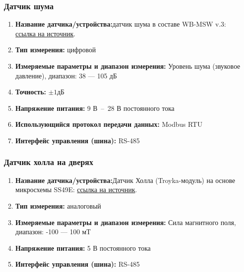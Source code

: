 \documentclass[a4paper,14pt]{extarticle}
\begin{document}
\begin{problem}
	
	\subsubsection*{Датчик шума}
	
	
	\begin{enumerate}
		\item \textbf{Название датчика/устройства:}датчик шума в составе WB-MSW v.3:  \href{https://wirenboard.com/ru/product/wb-msw-v3/}{ссылка на источник}.
		
		
		\item \textbf{Тип измерения:} цифровой
		
		\item  \textbf{Измеряемые параметры и диапазон измерения:}  Уровень шума (звуковое давление), диапазон: 38 --- 105 дБ
		
		\item  \textbf{Точность:} $\pm1 дБ$	
		\item  \textbf{Напряжение питания:} 9 В~--~28 В постоянного тока
		
		\item  \textbf{Использующийся протокол передачи данных:} Modbus RTU
		
		\item  \textbf{Интерфейс управления (шина):} RS-485
		
	\end{enumerate}
	
	
	\subsubsection*{Датчик холла на дверях}
	
	\begin{enumerate}
		\item \textbf{Название датчика/устройства:}Датчик Холла (Troyka-модуль) на основе микросхемы SS49E: \href{https://amperka.ru/product/troyka-hall-sensor}{ссылка на источник}.
		
		
		\item \textbf{Тип измерения:} аналоговый
		
		\item  \textbf{Измеряемые параметры и диапазон измерения:} Сила магнитного поля, диапазон: -100 --- 100 мТ
		
		\item  \textbf{Напряжение питания:} 5 В постоянного тока
		
		\item  \textbf{Интерфейс управления (шина):} RS-485
	\end{enumerate}
	

\end{problem}
\end{document}
